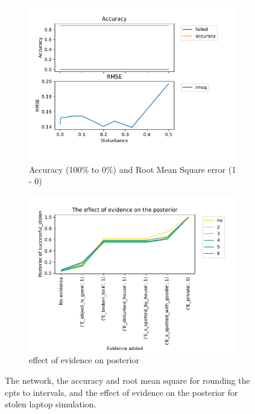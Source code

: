 \begin{figure}[h]
\begin{subfigure}{.5\textwidth}
\includegraphics[width=\linewidth]{../experiments/StolenLaptop/plots/performance_StolenLaptop.pdf}
\caption{Accuracy (100\% to 0\%) and Root Mean Square error (1 - 0) }
\label{laptopAcc}
\end{subfigure}
\begin{subfigure}{.5\textwidth}
\includegraphics[width=\linewidth]{../experiments/StolenLaptopVision/plots/posterior_StolenLaptopVision.pdf}
\caption{effect of evidence on posterior}
\label{visionlaptopPosterior}
\end{subfigure}
\caption{The network, the accuracy and root mean square for rounding the cpts to intervals, and the effect of evidence on the posterior for stolen laptop simulation.}
\label{vision}
\end{figure}



